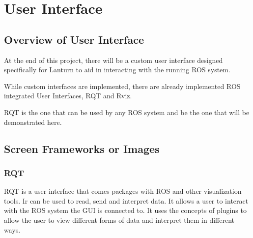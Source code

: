 \section{User Interface}
\label{sec:userinterface}

\subsection{Overview of User Interface}
\label{sec:overviewui}

At the end of this project, there will be a custom user interface designed
specifically for Lanturn to aid in interacting with the running ROS system. 
\par

While custom interfaces are implemented, there are already implemented ROS
integrated User Interfaces, RQT and Rviz.  
\par

RQT is the one that can be used by any ROS system and be the one that will be
demonstrated here.
\par

\subsection{Screen Frameworks or Images}
\label{sec:frameworks}

\subsubsection{RQT}

RQT is a user interface that comes packages with ROS and other visualization
tools. Ir can be used to read, send and interpret data. It allows a user to
interact with the ROS system the GUI is connected to. It uses the concepts of
plugins to allow the user to view different forms of data and interpret them in
different ways. 
\par

